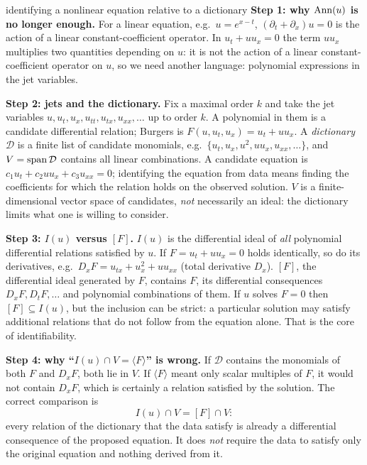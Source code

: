 \begin{explained}{identifying a nonlinear equation relative to a dictionary}
\textbf{Step 1: why $\operatorname{Ann}(u)$ is no longer enough.} For a linear equation, e.g.\ $u=e^{x-t}$, $(\partial_t+\partial_x)u=0$ is the action of a linear constant-coefficient operator. In $u_t+uu_x=0$ the term $uu_x$ multiplies two quantities depending on $u$: it is not the action of a linear constant-coefficient operator on $u$, so we need another language: polynomial expressions in the jet variables.

\medskip\textbf{Step 2: jets and the dictionary.} Fix a maximal order $k$ and take the jet variables $u,u_t,u_x,u_{tt},u_{tx},u_{xx},\dots$ up to order $k$. A polynomial in them is a candidate differential relation; Burgers is $F(u,u_t,u_x)=u_t+uu_x$. A \emph{dictionary} $\mathcal D$ is a finite list of candidate monomials, e.g.\ $\{u_t,u_x,u^2,uu_x,u_{xx},\dots\}$, and $V=\operatorname{span}\mathcal D$ contains all linear combinations. A candidate equation is $c_1u_t+c_2uu_x+c_3u_{xx}=0$; identifying the equation from data means finding the coefficients for which the relation holds on the observed solution. $V$ is a finite-dimensional vector space of candidates, \emph{not} necessarily an ideal: the dictionary limits what one is willing to consider.

\medskip\textbf{Step 3: $I(u)$ versus $[F]$.} $I(u)$ is the differential ideal of \emph{all} polynomial differential relations satisfied by $u$. If $F=u_t+uu_x=0$ holds identically, so do its derivatives, e.g.\ $D_xF=u_{tx}+u_x^2+uu_{xx}$ (total derivative $D_x$). $[F]$, the differential ideal generated by $F$, contains $F$, its differential consequences $D_xF,D_tF,\dots$ and polynomial combinations of them. If $u$ solves $F=0$ then $[F]\subseteq I(u)$, but the inclusion can be strict: a particular solution may satisfy additional relations that do not follow from the equation alone. That is the core of identifiability.

\medskip\textbf{Step 4: why ``$I(u)\cap V=\langle F\rangle$'' is wrong.} If $\mathcal D$ contains the monomials of both $F$ and $D_xF$, both lie in $V$. If $\langle F\rangle$ meant only scalar multiples of $F$, it would not contain $D_xF$, which is certainly a relation satisfied by the solution. The correct comparison is
\[
I(u)\cap V=[F]\cap V:
\]
every relation of the dictionary that the data satisfy is already a differential consequence of the proposed equation. It does \emph{not} require the data to satisfy only the original equation and nothing derived from it.


\end{explained}
